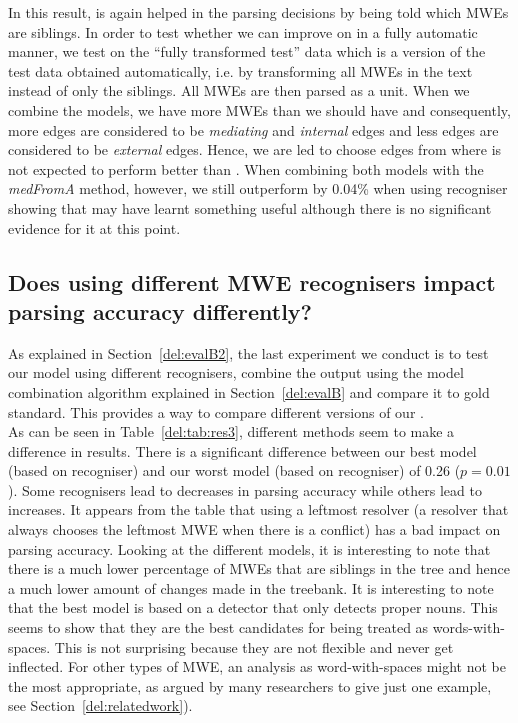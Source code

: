 \documentclass[output=paper]{langsci/langscibook}
\begin{document}
\indent In this result, {\modelB} is again helped in the parsing decisions by being told which MWEs are siblings. In order to test whether we can improve on {\modelA} in a fully automatic manner, we test {\modelB} on the ``fully transformed test'' data which is a version of the test data obtained automatically, i.e. by transforming all MWEs in the text instead of only the siblings. All MWEs are then parsed as a unit. When we combine the models, we have more MWEs than we should have and consequently, more edges are considered to be \textit{mediating} and \textit{internal} edges and less edges are considered to be \textit{external} edges. Hence, we are led to choose edges from {\modelA} where {\modelA} is not expected to perform better than {\modelB}. When combining both models with the \textit{medFromA} method, however, we still outperform {\modelA} by 0.04\% when using recogniser showing that {\modelB} may have learnt something useful although there is no significant evidence for it at this point. 
\subsection{Does using different MWE recognisers impact parsing accuracy differently?}
\label{del:q2}
\indent As explained in Section~\ref{del:evalB2}, the last experiment we conduct is to test our model using different recognisers, combine the output using the model combination algorithm explained in Section~\ref{del:evalB} and compare it to gold standard. This provides a way to compare different versions of our {\modelB}.\\	
\indent As can be seen in Table~\ref{del:tab:res3}, different  methods seem to make a difference in results. There is a significant difference between our best model (based on recogniser) and our worst model (based on recogniser) of 0.26 ($p=0.01$). Some recognisers lead to decreases in parsing accuracy while others lead to increases. It appears from the table that using a leftmost resolver (a resolver that always chooses the leftmost MWE when there is a conflict) has a bad impact on parsing accuracy. Looking at the different models, it is interesting to note that there is a much lower percentage of MWEs that are siblings in the tree and hence a much lower amount of changes made in the treebank. It is interesting to note that the best model is based on a detector that only detects proper nouns. This seems to show that they are the best candidates for being treated as words-with-spaces. This is not surprising because they are not flexible and never get inflected. For other types of MWE, an analysis as word-with-spaces might not be the most appropriate, as argued by many researchers \citep{sag02} to give just one example, see Section~\ref{del:relatedwork}).
\end{document}
